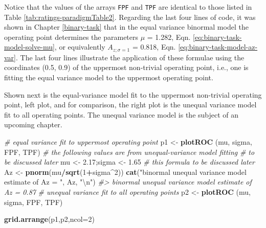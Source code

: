 \documentclass[
]{book}
\newenvironment{Shaded}{\begin{snugshade}}{\end{snugshade}}
\newcommand{\CharTok}[1]{\textcolor[rgb]{0.31,0.60,0.02}{#1}}
\newcommand{\CommentTok}[1]{\textcolor[rgb]{0.56,0.35,0.01}{\textit{#1}}}
\newcommand{\DataTypeTok}[1]{\textcolor[rgb]{0.13,0.29,0.53}{#1}}
\newcommand{\DecValTok}[1]{\textcolor[rgb]{0.00,0.00,0.81}{#1}}
\newcommand{\FloatTok}[1]{\textcolor[rgb]{0.00,0.00,0.81}{#1}}
\newcommand{\KeywordTok}[1]{\textcolor[rgb]{0.13,0.29,0.53}{\textbf{#1}}}
\newcommand{\NormalTok}[1]{#1}
\newcommand{\OperatorTok}[1]{\textcolor[rgb]{0.81,0.36,0.00}{\textbf{#1}}}
\newcommand{\StringTok}[1]{\textcolor[rgb]{0.31,0.60,0.02}{#1}}
\begin{document}
Notice that the values of the arrays \texttt{FPF} and \texttt{TPF} are identical to those listed in Table \ref{tab:ratings-paradigmTable2}. Regarding the last four lines of code, it was shown in Chapter \ref{binary-task} that in the equal variance binormal model the operating point determines the parameters \(\mu\) = 1.282, Eqn. \eqref{eq:binary-task-model-solve-mu}, or equivalently \(A_{z;\sigma = 1}\) = 0.818, Eqn. \eqref{eq:binary-task-model-az-var}. The last four lines illustrate the application of these formulae using the coordinates (0.5, 0.9) of the uppermost non-trivial operating point, i.e., one is fitting the equal variance model to the uppermost operating point.

Shown next is the equal-variance model fit to the uppermost non-trivial operating point, left plot, and for comparison, the right plot is the unequal variance model fit to all operating points. The unequal variance model is the subject of an upcoming chapter.

\begin{Shaded}
\begin{Highlighting}[]
\CommentTok{# equal variance fit to uppermost operating point}
\NormalTok{p1 <-}\StringTok{ }\KeywordTok{plotROC}\NormalTok{ (mu, sigma, FPF, TPF)}
\CommentTok{# the following values are from unequal-variance model fitting}
\CommentTok{# to be discussed later}
\NormalTok{mu <-}\StringTok{ }\FloatTok{2.17}\NormalTok{;sigma <-}\StringTok{ }\FloatTok{1.65}
\CommentTok{# this formula to be discussed later}
\NormalTok{Az <-}\StringTok{ }\KeywordTok{pnorm}\NormalTok{(mu}\OperatorTok{/}\KeywordTok{sqrt}\NormalTok{(}\DecValTok{1}\OperatorTok{+}\NormalTok{sigma}\OperatorTok{^}\DecValTok{2}\NormalTok{))}
\KeywordTok{cat}\NormalTok{(}\StringTok{"binormal unequal variance model estimate of Az = "}\NormalTok{, Az, }\StringTok{"}\CharTok{\textbackslash{}n}\StringTok{"}\NormalTok{)}
\CommentTok{#> binormal unequal variance model estimate of Az =  0.87}
\CommentTok{# unequal variance fit to all operating points}
\NormalTok{p2 <-}\StringTok{ }\KeywordTok{plotROC}\NormalTok{ (mu, sigma, FPF, TPF)}
\end{Highlighting}
\end{Shaded}

\begin{Shaded}
\begin{Highlighting}[]
\KeywordTok{grid.arrange}\NormalTok{(p1,p2,}\DataTypeTok{ncol=}\DecValTok{2}\NormalTok{)}
\end{Highlighting}
\end{Shaded}
\end{document}
